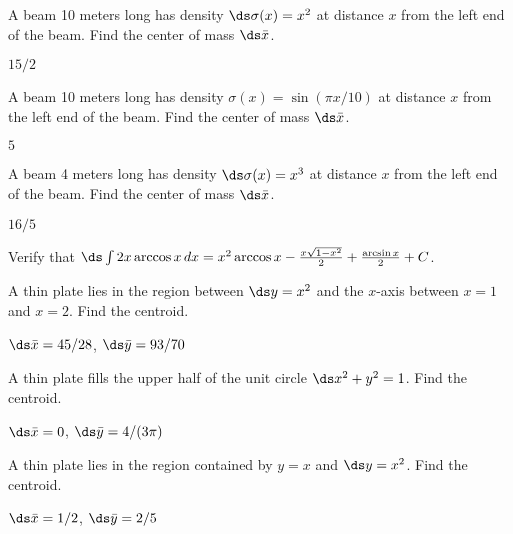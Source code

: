 \begin{exercises}

\begin{exercise} A beam 10 meters long has density $\ds \sigma(x)=x^2$ at
distance $x$ from the left end of the beam. Find the center of mass
$\ds \bar x$.
\begin{answer} $15/2$
\end{answer}\end{exercise}

\begin{exercise} A beam 10 meters long has density $\sigma(x)=\sin(\pi x/10)$ at
distance $x$ from the left end of the beam. Find the center of mass
$\ds \bar x$.
\begin{answer} $5$
\end{answer}\end{exercise}

\begin{exercise} A beam 4 meters long has density $\ds \sigma(x)=x^3$ at
distance $x$ from the left end of the beam. Find the center of mass
$\ds \bar x$.
\begin{answer} $16/5$
\end{answer}\end{exercise}

\begin{exercise} Verify that $\ds\int 2x\arccos x\,dx=
x^2\arccos x-{x\sqrt{1-x^2}\over2}+{\arcsin x\over 2}+C$.

\begin{exercise} A thin plate lies in the region between $\ds y=x^2$ and the $x$-axis
between $x=1$ and $x=2$. Find the centroid.
\begin{answer} $\ds \bar x=45/28$, $\ds \bar y = 93/70$
\end{answer}\end{exercise}

\begin{exercise} A thin plate fills the upper half of the unit circle
$\ds x^2+y^2=1$. Find the centroid.
\begin{answer} $\ds \bar x=0$, $\ds \bar y=4/(3\pi)$
\end{answer}\end{exercise}

\begin{exercise} A thin plate lies in the region contained by $y=x$ and
$\ds y=x^2$. Find the centroid.
\begin{answer} $\ds \bar x=1/2$, $\ds \bar y=2/5$
\end{answer}\end{exercise}


\end{exercise}
\end{exercises}
